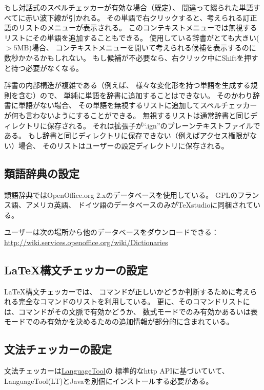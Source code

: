 もし対話式のスペルチェッカーが有効な場合（既定）、
間違って綴られた単語すべてに赤い波下線が引かれる。
その単語で右クリックすると、考えられる訂正語のリストのメニューが表示される。
このコンテキストメニューでは無視するリストにその単語を追加することもできる。
使用している辞書がとても大きい(${}>5\mathrm{MB}$)場合、
コンテキストメニューを開いて考えられる候補を表示するのに数秒かかるかもしれない。
もし候補が不必要なら、右クリック中にShiftを押すと待つ必要がなくなる。


辞書の内部構造が複雑である（例えば、
様々な変化形を持つ単語を生成する規則を含む）ので、
単純に単語を辞書に追加することはできない。
そのかわり辞書に単語がない場合、
その単語を無視するリストに追加してスペルチェッカーが何も言わないようにすることができる。
無視するリストは通常辞書と同じディレクトリに保存される。
それは拡張子が``.ign''のプレーンテキストファイルである。
もし辞書と同じディレクトリに保存できない（例えばアクセス権限がない）場合、
そのリストはユーザーの設定ディレクトリに保存される。

\subsection{類語辞典の設定}

類語辞典ではOpenOffice.org 2.xのデータベースを使用している。
GPLのフランス語、アメリカ英語、
ドイツ語のデータベースのみがTeXstudioに同梱されている。

ユーザーは次の場所から他のデータベースをダウンロードできる：
\href{http://wiki.services.openoffice.org/wiki/Dictionaries}{http://wiki.services.openoffice.org/wiki/Dictionaries}

\subsection{LaTeX構文チェッカーの設定}

LaTeX構文チェッカーでは、
コマンドが正しいかどうか判断するために考えられる完全なコマンドのリストを利用している。
更に、そのコマンドリストには、コマンドがその文脈で有効かどうか、
数式モードでのみ有効かあるいは表モードでのみ有効かを決めるための追加情報が部分的に含まれている。

\subsection{文法チェッカーの設定}

文法チェッカーは\href{http://www.languagetool.org/}{LanguageTool}の
標準的なhttp APIに基づいていて、LanguageTool(LT)とJavaを別個にインストールする必要がある。

